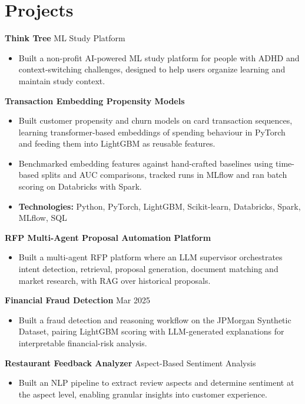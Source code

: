 \documentclass[10pt,a4paper]{article}
\begin{document}
\section{Projects}
\textbf{Think Tree} \textbar{} ML Study Platform\par
\begin{itemize}
  \item Built a non-profit AI-powered ML study platform for people with ADHD and context-switching challenges, designed to help users organize learning and maintain study context.
\end{itemize}
\textbf{Transaction Embedding Propensity Models}\par
\begin{itemize}
  \item Built customer propensity and churn models on card transaction sequences, learning transformer-based embeddings of spending behaviour in PyTorch and feeding them into LightGBM as reusable features.
  \item Benchmarked embedding features against hand-crafted baselines using time-based splits and AUC comparisons, tracked runs in MLflow and ran batch scoring on Databricks with Spark.
  \item \textbf{Technologies:} Python, PyTorch, LightGBM, Scikit-learn, Databricks, Spark, MLflow, SQL
\end{itemize}
\textbf{RFP Multi-Agent Proposal Automation Platform}\par
\begin{itemize}
  \item Built a multi-agent RFP platform where an LLM supervisor orchestrates intent detection, retrieval, proposal generation, document matching and market research, with RAG over historical proposals.
\end{itemize}
\textbf{Financial Fraud Detection} \textbar{} Mar 2025\par
\begin{itemize}
  \item Built a fraud detection and reasoning workflow on the JPMorgan Synthetic Dataset, pairing LightGBM scoring with LLM-generated explanations for interpretable financial-risk analysis.
\end{itemize}
\textbf{Restaurant Feedback Analyzer} \textbar{} Aspect-Based Sentiment Analysis\par
\begin{itemize}
  \item Built an NLP pipeline to extract review aspects and determine sentiment at the aspect level, enabling granular insights into customer experience.
\end{itemize}
\end{document}
